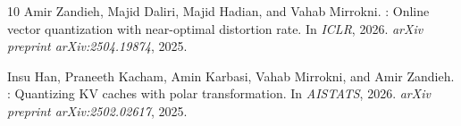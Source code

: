\documentclass[11pt]{article}
\begin{document}
\begin{thebibliography}{10}
Amir Zandieh, Majid Daliri, Majid Hadian, and Vahab Mirrokni.
: Online vector quantization with near-optimal distortion rate.
\newblock In \emph{ICLR}, 2026.
\newblock \emph{arXiv preprint arXiv:2504.19874}, 2025.

Insu Han, Praneeth Kacham, Amin Karbasi, Vahab Mirrokni, and Amir Zandieh.
: Quantizing {KV} caches with polar transformation.
\newblock In \emph{AISTATS}, 2026.
\newblock \emph{arXiv preprint arXiv:2502.02617}, 2025.

\end{thebibliography}
\end{document}

